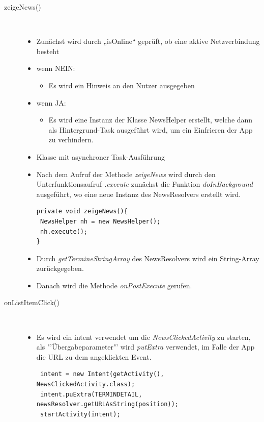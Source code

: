 \begin{description}
\item[zeigeNews()]~\par
\begin{itemize}
\item Zunächst wird durch „isOnline“ geprüft, ob eine aktive Netzverbindung besteht
\item wenn NEIN:
\begin{itemize}
\item Es wird ein Hinweis an den Nutzer ausgegeben
\end{itemize}
\item wenn JA: 
\begin{itemize}
\item Es wird eine Instanz der Klasse NewsHelper erstellt, welche dann als Hintergrund-Task ausgeführt wird, um ein Einfrieren der App zu verhindern.
\end{itemize}
\end{itemize}
\begin{itemize}
\item Klasse mit asynchroner Task-Ausführung
\item Nach dem Aufruf der Methode \textit{zeigeNews} wird durch den Unterfunktionsaufruf \textit{.execute} zunächst die Funktion \textit{doInBackground} ausgeführt, wo eine neue Instanz des NewsResolvers erstellt wird.
\begin{lstlisting} 
private void zeigeNews(){
 NewsHelper nh = new NewsHelper();
 nh.execute();
}
\end{lstlisting}   
\item Durch \textit{getTermineStringArray} des NewsResolvers wird ein String-Array zurückgegeben.
\item Danach wird die Methode \textit{onPostExecute} gerufen.
\end{itemize}
\item[onListItemClick()]~\par
\begin{itemize}
\item Es wird ein intent verwendet um die \textit{NewsClickedActivity} zu starten, als "'Übergabeparameter"' wird \textit{putExtra} verwendet, im Falle der App die URL zu dem angeklickten Event.
\begin{lstlisting}
 intent = new Intent(getActivity(), NewsClickedActivity.class);
 intent.puExtra(TERMINDETAIL, newsResolver.getURLAsString(position));
 startActivity(intent);
\end{lstlisting}
\end{itemize}


\end{description}
